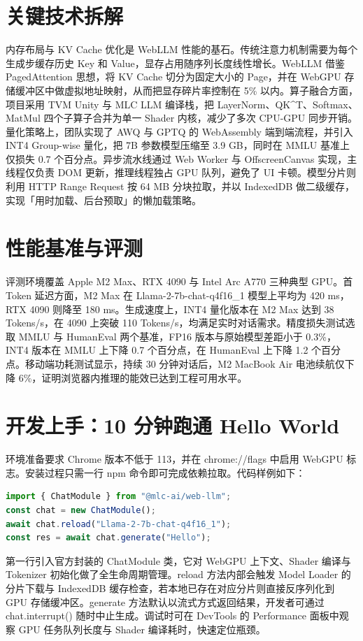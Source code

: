 \chapter{关键技术拆解}
内存布局与 KV Cache 优化是 WebLLM 性能的基石。传统注意力机制需要为每个生成步缓存历史 Key 和 Value，显存占用随序列长度线性增长。WebLLM 借鉴 PagedAttention 思想，将 KV Cache 切分为固定大小的 Page，并在 WebGPU 存储缓冲区中做虚拟地址映射，从而把显存碎片率控制在 5\%{} 以内。算子融合方面，项目采用 TVM Unity 与 MLC LLM 编译栈，把 LayerNorm、QK\^{}T、Softmax、MatMul 四个子算子合并为单一 Shader 内核，减少了多次 CPU-GPU 同步开销。量化策略上，团队实现了 AWQ 与 GPTQ 的 WebAssembly 端到端流程，并引入 INT4 Group-wise 量化，把 7B 参数模型压缩至 3.9 GB，同时在 MMLU 基准上仅损失 0.7 个百分点。异步流水线通过 Web Worker 与 OffscreenCanvas 实现，主线程仅负责 DOM 更新，推理线程独占 GPU 队列，避免了 UI 卡顿。模型分片则利用 HTTP Range Request 按 64 MB 分块拉取，并以 IndexedDB 做二级缓存，实现「用时加载、后台预取」的懒加载策略。\par
\chapter{性能基准与评测}
评测环境覆盖 Apple M2 Max、RTX 4090 与 Intel Arc A770 三种典型 GPU。首 Token 延迟方面，M2 Max 在 Llama-2-7b-chat-q4f16\_{}1 模型上平均为 420 ms，RTX 4090 则降至 180 ms。生成速度上，INT4 量化版本在 M2 Max 达到 38 Tokens/s，在 4090 上突破 110 Tokens/s，均满足实时对话需求。精度损失测试选取 MMLU 与 HumanEval 两个基准，FP16 版本与原始模型差距小于 0.3\%{}，INT4 版本在 MMLU 上下降 0.7 个百分点，在 HumanEval 上下降 1.2 个百分点。移动端功耗测试显示，持续 30 分钟对话后，M2 MacBook Air 电池续航仅下降 6\%{}，证明浏览器内推理的能效已达到工程可用水平。\par
\chapter{开发上手：10 分钟跑通 Hello World}
环境准备要求 Chrome 版本不低于 113，并在 chrome://flags 中启用 WebGPU 标志。安装过程只需一行 npm 命令即可完成依赖拉取。代码样例如下：\par
\begin{lstlisting}[language=js]
import { ChatModule } from "@mlc-ai/web-llm";
const chat = new ChatModule();
await chat.reload("Llama-2-7b-chat-q4f16_1");
const res = await chat.generate("Hello");
\end{lstlisting}
第一行引入官方封装的 ChatModule 类，它对 WebGPU 上下文、Shader 编译与 Tokenizer 初始化做了全生命周期管理。reload 方法内部会触发 Model Loader 的分片下载与 IndexedDB 缓存检查，若本地已存在对应分片则直接反序列化到 GPU 存储缓冲区。generate 方法默认以流式方式返回结果，开发者可通过 chat.interrupt() 随时中止生成。调试时可在 DevTools 的 Performance 面板中观察 GPU 任务队列长度与 Shader 编译耗时，快速定位瓶颈。\par
